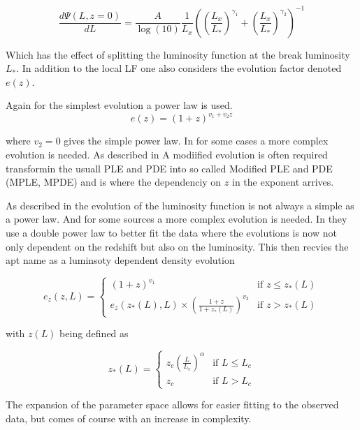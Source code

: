 \documentclass{article}
\begin{document}
\begin{equation}
    \frac{d\Psi(L,z=0)}{dL} =  \frac{A}{\log(10)} \frac{1}{L_x} \left( \left( \frac{L_x}{L_*} \right)^{\gamma_1} + \left( \frac{L_x}{L_*} \right)^{\gamma_2} \right)^{-1}
\end{equation}

Which has the effect of splitting the luminosity function at the break luminosity $L_*$.
In addition to the local LF one also considers the evolution factor denoted $e(z)$. 

Again for the simplest evolution a power law is used.
 $$
e(z) = (1 + z)^{v_1 + v_2 z}
 $$

 where $v_2 = 0$ gives the simple power law. In for some cases a more complex evolution is needed. As described in 
 \cite{Ajello_2009} A modiified evolution is often required transformin the usuall PLE and PDE into so called
 Modified PLE and PDE (MPLE, MPDE) and is where the dependenciy on $z$ in the exponent arrives. 

 As described in \cite{Ueda_2003} the evolution of the luminosity function is not always a simple as a power law.
 And for some sources a more complex evolution is needed. In \cite{Ueda_2003} they use a double power law to better fit the data where 
 the evolutions is now not only dependent on the redshift but also on the luminosity. This then recvies the apt name as a luminsoty dependent density evolution


 \begin{equation}
    e_z(z, L) = 
    \begin{cases} 
    (1 + z)^{v_1} & \text{if } z \leq z_*(L) \\
    e_z(z_*(L), L) \times \left( \frac{1 + z}{1 + z_*(L)} \right)^{v_2} & \text{if } z >  z_*(L)
    \end{cases}
 \end{equation}

 with $z(L)$ being defined as

 \begin{equation}
    z_*(L) = 
    \begin{cases} 
    z_c \left( \frac{L}{L_c} \right)^\alpha & \text{if } L \leq L_c \\
    z_c & \text{if } L > L_c 
    \end{cases}
 \end{equation}


 The expansion of the parameter space allows for easier fitting to the observed data, but comes of course with an increase in complexity. 
\end{document}
